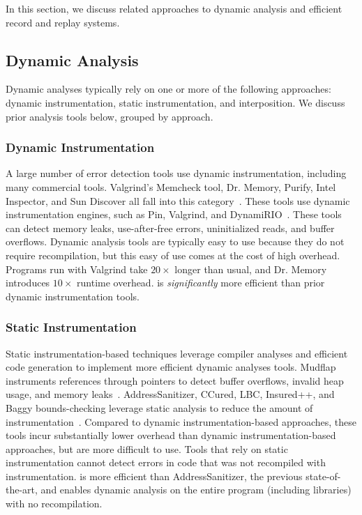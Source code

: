 In this section, we discuss related approaches to dynamic analysis and efficient record and replay systems.

\subsection{Dynamic Analysis}
Dynamic analyses typically rely on one or more of the following approaches: dynamic instrumentation, static instrumentation, and interposition. We discuss prior analysis tools below, grouped by approach.

\subsubsection*{Dynamic Instrumentation} 
A large number of error detection tools use dynamic instrumentation, including many commercial tools. Valgrind's Memcheck tool, Dr. Memory, Purify, Intel Inspector, and Sun Discover all fall into this category~\cite{ overflow:drmemory, overflow:purify, overflow:inspector, overflow:valgrind, overflow:discover}. These tools use dynamic instrumentation engines, such as Pin, Valgrind, and DynamiRIO~\cite{DynamoRIO, Pin, overflow:valgrind}. These tools can detect memory leaks, use-after-free errors, uninitialized reads, and buffer overflows. Dynamic analysis tools are typically easy to use because they do not require recompilation, but this easy of use comes at the cost of high overhead. Programs run with Valgrind take $20\times$ longer than usual, and Dr. Memory introduces $10\times$ runtime overhead. \doubletake{} is \emph{significantly} more efficient than prior dynamic instrumentation tools.

\subsubsection*{Static Instrumentation}
Static instrumentation-based techniques leverage compiler analyses and efficient code generation to implement more efficient dynamic analyses tools. Mudflap instruments references through pointers to detect buffer overflows, invalid heap usage, and memory leaks~\cite{overflow:Mudflap}. AddressSanitizer, CCured, LBC, Insured++, and Baggy bounds-checking leverage static analysis to reduce the amount of instrumentation~\cite{overflow:Baggy, overflow:lbc,  overflow:ccured, AddressSanitizer}. Compared to dynamic instrumentation-based approaches, these tools incur substantially lower overhead than dynamic instrumentation-based approaches, but are more difficult to use. Tools that rely on static instrumentation cannot detect errors in code that was not recompiled with instrumentation. \doubletake{} is more efficient than AddressSanitizer, the previous state-of-the-art, and enables dynamic analysis on the entire program (including libraries) with no recompilation.

